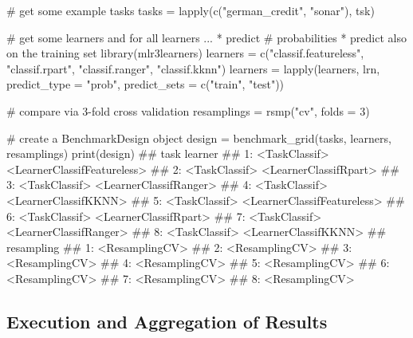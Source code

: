 \documentclass[
  11pt,
  parskip=half,
  DIV=calc,
  BCOR=10mm,
  x11names]{scrbook}
\newenvironment{Shaded}{}{}
\newcommand{\CommentTok}[1]{\textcolor[rgb]{0.00,0.50,0.00}{#1}}
\newcommand{\DataTypeTok}[1]{#1}
\newcommand{\DecValTok}[1]{#1}
\newcommand{\KeywordTok}[1]{\textcolor[rgb]{0.00,0.00,1.00}{#1}}
\newcommand{\NormalTok}[1]{#1}
\newcommand{\StringTok}[1]{\textcolor[rgb]{0.00,0.50,0.50}{#1}}
\begin{document}
\begin{Shaded}
\begin{Highlighting}[]
\CommentTok{# get some example tasks}
\NormalTok{tasks =}\StringTok{ }\KeywordTok{lapply}\NormalTok{(}\KeywordTok{c}\NormalTok{(}\StringTok{"german_credit"}\NormalTok{, }\StringTok{"sonar"}\NormalTok{), tsk)}

\CommentTok{# get some learners and for all learners ...  * predict}
\CommentTok{# probabilities * predict also on the training set}
\KeywordTok{library}\NormalTok{(mlr3learners)}
\NormalTok{learners =}\StringTok{ }\KeywordTok{c}\NormalTok{(}\StringTok{"classif.featureless"}\NormalTok{, }\StringTok{"classif.rpart"}\NormalTok{, }\StringTok{"classif.ranger"}\NormalTok{, }
  \StringTok{"classif.kknn"}\NormalTok{)}
\NormalTok{learners =}\StringTok{ }\KeywordTok{lapply}\NormalTok{(learners, lrn, }\DataTypeTok{predict_type =} \StringTok{"prob"}\NormalTok{, }\DataTypeTok{predict_sets =} \KeywordTok{c}\NormalTok{(}\StringTok{"train"}\NormalTok{, }
  \StringTok{"test"}\NormalTok{))}

\CommentTok{# compare via 3-fold cross validation}
\NormalTok{resamplings =}\StringTok{ }\KeywordTok{rsmp}\NormalTok{(}\StringTok{"cv"}\NormalTok{, }\DataTypeTok{folds =} \DecValTok{3}\NormalTok{)}

\CommentTok{# create a BenchmarkDesign object}
\NormalTok{design =}\StringTok{ }\KeywordTok{benchmark_grid}\NormalTok{(tasks, learners, resamplings)}
\KeywordTok{print}\NormalTok{(design)}
\NormalTok{##             task                     learner}
\NormalTok{## 1: <TaskClassif> <LearnerClassifFeatureless>}
\NormalTok{## 2: <TaskClassif>       <LearnerClassifRpart>}
\NormalTok{## 3: <TaskClassif>      <LearnerClassifRanger>}
\NormalTok{## 4: <TaskClassif>        <LearnerClassifKKNN>}
\NormalTok{## 5: <TaskClassif> <LearnerClassifFeatureless>}
\NormalTok{## 6: <TaskClassif>       <LearnerClassifRpart>}
\NormalTok{## 7: <TaskClassif>      <LearnerClassifRanger>}
\NormalTok{## 8: <TaskClassif>        <LearnerClassifKKNN>}
\NormalTok{##        resampling}
\NormalTok{## 1: <ResamplingCV>}
\NormalTok{## 2: <ResamplingCV>}
\NormalTok{## 3: <ResamplingCV>}
\NormalTok{## 4: <ResamplingCV>}
\NormalTok{## 5: <ResamplingCV>}
\NormalTok{## 6: <ResamplingCV>}
\NormalTok{## 7: <ResamplingCV>}
\NormalTok{## 8: <ResamplingCV>}
\end{Highlighting}
\end{Shaded}

\hypertarget{bm-exec}{%
\subsection{Execution and Aggregation of Results}\label{bm-exec}}
\end{document}

